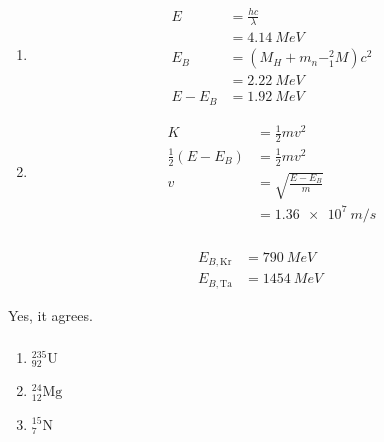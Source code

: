 \documentclass{article}
\begin{document}
\begin{enumerate}
  \item

        \begin{align*}
          E       & = \frac{h c}{\lambda}      \\
                  & = \qty{4.14}{MeV}          \\
          E_B     & = (M_H + m_n - ^2_1 M) c^2 \\
                  & = \qty{2.22}{MeV}          \\
          E - E_B & = \qty{1.92}{MeV}
        \end{align*}

  \item

        \begin{align*}
          K                     & = \frac{1}{2} m v^2        \\
          \frac{1}{2} (E - E_B) & = \frac{1}{2} m v^2        \\
          v                     & = \sqrt{\frac{E - E_B}{m}} \\
                                & = \qty{1.36e7}{m/s}
        \end{align*}
\end{enumerate}

\setcounter{subsubsection}{10}
\subsubsection{}

\begin{align*}
  E_{B,\text{Kr}} & = \qty{790}{MeV}  \\
  E_{B,\text{Ta}} & = \qty{1454}{MeV}
\end{align*}

Yes, it agrees.

\setcounter{subsubsection}{12}
\subsubsection{}

\begin{enumerate}
  \item $^{235}_{92} \text{U}$

  \item $^{24}_{12} \text{Mg}$

  \item $^{15}_7 \text{N}$
\end{enumerate}
\end{document}
